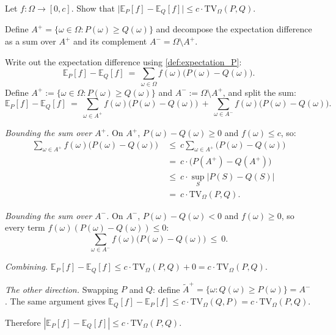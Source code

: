 \documentclass[fontsize=11pt, parskip=half]{scrartcl}
\newcommand{\Ex}{\mathbb{E}}
\newcommand{\TV}[1][]{\mathrm{TV}_{#1}}
\begin{document}
\begin{exercise}
\label{prob:auto3}
\skippable
Let $f : \Omega \to [0, c]$. Show that
$\big|\Ex_P[f] - \Ex_Q[f]\big| \leq c \cdot \TV[\Omega](P, Q)$.


\begin{hint}
Define $A^+ = \{\omega \in \Omega : P(\omega) \geq Q(\omega)\}$ and decompose the expectation difference as a sum over $A^+$ and its complement $A^- = \Omega \setminus A^+$.
\end{hint}
\end{exercise}

\begin{solution}
Write out the expectation difference using \cref{def:expectation_P}:
\[
    \Ex_P[f] - \Ex_Q[f]
    ~=~ \sum_{\omega \in \Omega} f(\omega)\big(P(\omega) - Q(\omega)\big).
\]
Define $A^+ := \{\omega \in \Omega : P(\omega) \geq Q(\omega)\}$ and $A^- := \Omega \setminus A^+$, and split the sum:
\[
    \Ex_P[f] - \Ex_Q[f]
    ~=~ \sum_{\omega \in A^+} f(\omega)\big(P(\omega) - Q(\omega)\big)
    ~+~ \sum_{\omega \in A^-} f(\omega)\big(P(\omega) - Q(\omega)\big).
\]

\emph{Bounding the sum over $A^+$.}
On $A^+$, $P(\omega) - Q(\omega) \geq 0$ and $f(\omega) \leq c$, so:
\begin{align*}
    \sum_{\omega \in A^+} f(\omega)\big(P(\omega) - Q(\omega)\big)
    ~&\leq~ c \sum_{\omega \in A^+} \big(P(\omega) - Q(\omega)\big) \\
    ~&=~ c \cdot \big(P(A^+) - Q(A^+)\big) \\
    ~&\leq~ c \cdot \sup_S |P(S) - Q(S)| \\
    ~&=~ c \cdot \TV[\Omega](P, Q).
\end{align*}

\emph{Bounding the sum over $A^-$.}
On $A^-$, $P(\omega) - Q(\omega) < 0$ and $f(\omega) \geq 0$, so every term $f(\omega)(P(\omega) - Q(\omega)) \leq 0$:
\[
    \sum_{\omega \in A^-} f(\omega)\big(P(\omega) - Q(\omega)\big) ~\leq~ 0.
\]

\emph{Combining.}
$\Ex_P[f] - \Ex_Q[f] \leq c \cdot \TV[\Omega](P,Q) + 0 = c \cdot \TV[\Omega](P,Q)$.

\emph{The other direction.}
Swapping $P$ and $Q$: define $\tilde{A}^+ = \{\omega : Q(\omega) \geq P(\omega)\} = A^-$. The same argument gives $\Ex_Q[f] - \Ex_P[f] \leq c \cdot \TV[\Omega](Q, P) = c \cdot \TV[\Omega](P, Q)$.

Therefore $|\Ex_P[f] - \Ex_Q[f]| \leq c \cdot \TV[\Omega](P, Q)$.
\end{solution}
\end{document}

